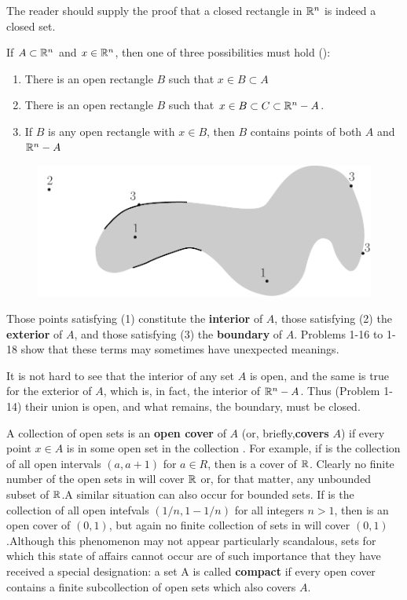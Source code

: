The reader should supply the proof that a closed rectangle in
$\mathbb{R}^n$ is indeed a closed set.

If $A\subset \mathbb{R}^n$ and $x\in \mathbb{R}^n$, then one of three possibilities must
hold ():
\begin{enumerate}[label={\arabic*.\,}]
    \item There is an open rectangle $B$ such that $x\in B\subset A$
    \item There is an open rectangle $B$ such that $x \in B \subset C \subset \mathbb{R}^n-A$.
    \item If $B$ is any open rectangle with $x\in B$, then $B$ contains points of both $A$ and $\mathbb{R}^n-A$
\end{enumerate}

\begin{figure}[!htb]
    \centering
    \includegraphics[width=.75\linewidth]{./pics/Fig1-2.pdf}
    \caption{}
    \label{Fig 1-2}
\end{figure}

Those points satisfying (1) constitute the \textbf{interior} of $A$, those
satisfying (2) the \textbf{exterior} of $A$, and those satisfying (3) the
\textbf{boundary} of $A$. Problems 1-16 to 1-18 show that these terms
may sometimes have unexpected meanings.

It is not hard to see that the interior of any set $A$ is open,
and the same is true for the exterior of $A$, which is, in fact, the
interior of $\mathbb{R}^n-A$. Thus (Problem 1-14) their union is open,
and what remains, the boundary, must be closed.

A collection  of open sets is an \textbf{open cover} of $A$ 
(or, briefly,\textbf{covers} $A$) if every point $x \in A$ is 
in some open set in the collection .
For example, if  is the collection of all open
intervals $(a, a + 1)$ for $a\in R$, then  is a cover of $\mathbb{R}$.
Clearly no finite number of the open sets in  will cover $\mathbb{R}$ or, 
for that matter, any unbounded subset of $\mathbb{R}$.A similar situation can
also occur for bounded sets. 
If  is the collection of all open
intefvals $(1/n, 1-1/n)$ for all integers $n > 1$, then  is an
open cover of $(0,1)$, but again no finite collection of sets in
 will cover $(0,1)$.Although this phenomenon may not appear
particularly scandalous, sets for which this state of affairs
cannot occur are of such importance that they have received a
special designation: a set A is called \textbf{compact} if every open
cover  contains a finite subcollection of open sets which
also covers $A$.

